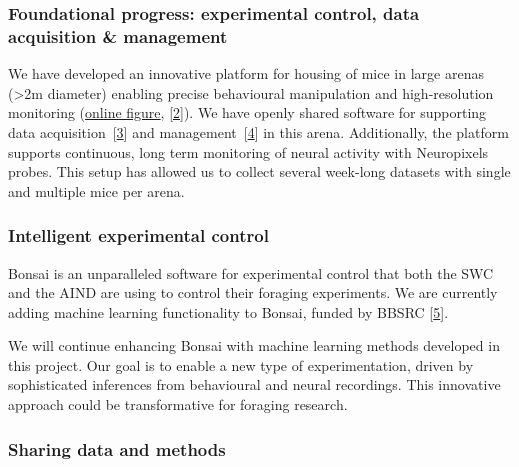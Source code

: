 \subsubsection{Foundational progress: experimental control, data acquisition \& management}

We have developed an innovative platform for housing of mice in large arenas
(\textgreater 2m diameter) enabling precise behavioural manipulation and
high-resolution monitoring
(\href{https://www.gatsby.ucl.ac.uk/~rapela/bbsrc\_nsfbio/figures/foragingArena.png}{online
figure},
[\href{https://www.abstractsonline.com/pp8/?_gl=1*it0gi6*_gcl_au*MTUyNDE0NDQwLjE3Mjc2OTgyODM.*_ga*MTUxNDI2NDg5LjE3Mjc2OTgyODM.*_ga_T09K3Q2WDN*MTcyOTUwNDUzNy4yLjEuMTcyOTUwNDY3Ny41NC4wLjA.#!/20433/presentation/22271}{2}]).
%
We have openly shared software for supporting data
acquisition~[\href{https://github.com/SainsburyWellcomeCentre/aeon_acquisition}{3}]
and
management~[\href{https://github.com/SainsburyWellcomeCentre/aeon_mecha}{4}] in this
arena.
%
Additionally, the platform supports continuous, long term monitoring of neural
activity with Neuropixels probes.
%
This setup has allowed us to collect several week-long datasets with single and
multiple mice per arena.


\subsubsection{Intelligent experimental control}

Bonsai is an unparalleled software for experimental control that both the SWC
and the AIND are using to control their foraging experiments.
%
We are currently adding machine learning functionality to Bonsai, funded by
BBSRC
[\href{https://gow.bbsrc.ukri.org/grants/AwardDetails.aspx?FundingReference=BB\%2FW019132\%2F1}{5}].

We will continue enhancing Bonsai with machine learning methods developed in
this project.
%
Our goal is to enable a new type of experimentation, driven by sophisticated
inferences from behavioural and neural recordings. This innovative approach
could be transformative for foraging research.

%

\subsubsection{Sharing data and methods}

